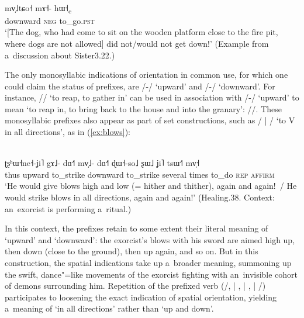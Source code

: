 \begin{exe}
	\ex
	\label{ex:downwd}
	\\
	\gll mv̩˩tɕo˧	mɤ˧-	hɯ˧\textsubscript{c}\\
		downward	\textsc{neg}		to\_go.\textsc{pst}\\
	\glt ‘[The dog, who had come to sit on the wooden platform
	close to the fire pit, where dogs are not allowed] did not/would not get down!’ (Example from
	a~discussion about Sister3.22.)
\end{exe}

The only monosyllabic indications of orientation in common use, for which one could claim the status
of prefixes, are /-/ ‘upward’ and /-/ ‘downward’. For instance, // ‘to
reap, to gather in’ can be used in association with /-/ ‘upward’ to mean ‘to reap in, to
bring back to the house and into the granary’: //. These monosyllabic prefixes also
appear as part of set constructions, such as / {\kern2pt}|{\kern2pt} / ‘to V in all directions’, as in (\ref{ex:blows}):

\begin{exe}
  \ex
  \label{ex:blows}
  \\
  \gll ʈʂʰɯ˧ne˧-ʝi˥	gɤ˩-	dɑ˧˥	mv̩˩-		dɑ˧˥	ɖɯ˧-so˩ ʂɯ˩		ʝi˥	tsɯ˧˥	mv̩˧\\
  thus		upward	to\_strike	downward	to\_strike	several	times		to\_do	\textsc{rep}
  \textsc{affirm}\\
  \glt ‘He would give blows high and low (= hither and thither), again and again!~/ He would strike
  blows in all directions, again and again!’ (Healing.38. Context: an~exorcist is performing
  a~ritual.)
\end{exe}

In this context, the prefixes retain to some extent their literal meaning of ‘upward’ and
‘downward’: the exorcist’s blows with his sword are aimed high up, then down (close to the ground), then up again, and so on. But in this construction, the spatial indications take up a~broader meaning, summoning
up the swift, dance"=like movements of the exorcist fighting with an~invisible cohort of demons
surrounding him. Repetition of the prefixed verb (/, {\kern2pt}|{\kern2pt} , {\kern2pt}|{\kern2pt}
, {\kern2pt}|{\kern2pt} /) participates to loosening the exact indication of
spatial orientation, yielding a~meaning of ‘in all directions’ rather than ‘up and down’.

